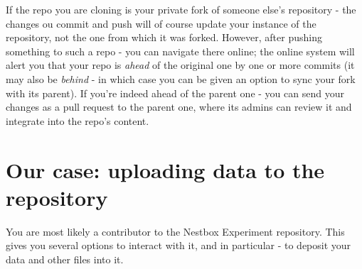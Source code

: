 \documentclass{tufte-handout}
\begin{document}
If the repo you are cloning is your private fork of someone else's repository - the changes ou commit and push will of course update your instance of the repository, not the one from which it was forked. However, after pushing something to such a repo - you can navigate there online; the online system will alert you that your repo is \textit{ahead} of the original one by one or more commits (it may also be \textit{behind} - in which case you can be given an option to sync your fork with its parent). If you're indeed ahead of the parent one - you can send your changes as a pull request to the parent one, where its admins can review it and integrate into the repo's content.

\section{Our case: uploading data to the repository}

You are most likely a contributor to the Nestbox Experiment repository. This gives you several options to interact with it, and in particular - to deposit your data and other files into it.
\end{document}
